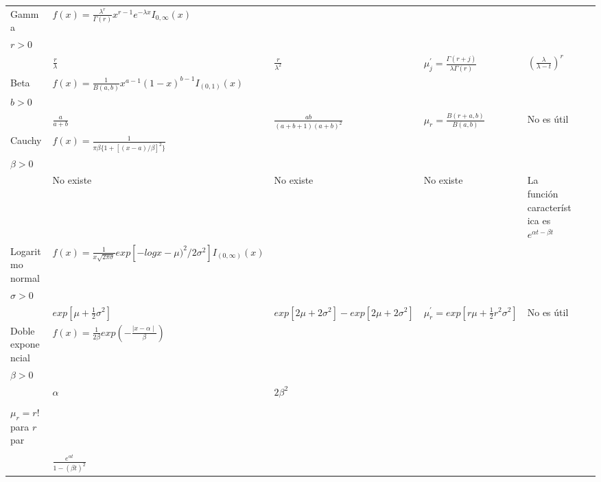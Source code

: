 \begin{table}[ht!]
\begin{tabular}{|p{1.5cm}|p{5.12cm}|p{2.13cm}|p{1.8cm}|p{2.13cm}|p{4cm}|p{2cm}|}
        Gamma &
        $f(x) = \frac{\lambda^r}{\Gamma(r)}x^{r-1}e^{-\lambda x}I_{0,\infty}(x)$ &
        \Longunderstack{
        $\lambda > 0$ \\ $r > 0$
        \\} &
        $\frac{r}{\lambda}$ &
        $\frac{r}{\lambda^2}$ &
        $\mu_j^{'} = \frac{\Gamma(r+j)}{\lambda\Gamma(r)}$ &
        $(\frac{\lambda}{\lambda - t})^r$
        \\ \hline
        
        Beta &
        $f(x)=\frac{1}{B(a,b)}x^{a-1}(1-x)^{b-1}I_{(0,1)}(x)$ &
        \Longunderstack{
        $a > 0$ \\ $b > 0$
        \\} &
        $\frac{a}{a+b}$ &
        $\frac{ab}{(a+b+1)(a+b)^2}$ &
        $\mu_r = \frac{B(r+a,b)}{B(a,b)}$ &
        No es útil
        \\ \hline
        
        Cauchy &
        $f(x) = \frac{1}{\pi \beta\{1+[(x-a)/\beta]^2\}}$  &
        \Longunderstack{
        $-\infty < \lambda < \infty $ \\ $\beta > 0$
        \\} &
        No existe &
        No existe &
        No existe &
        \footnotesize
        La función característica es $e^{\alpha t-\beta t}$
        \\ \hline
        
        Logaritmo normal &
        \footnotesize
        $f(x) = \frac{1}{x\sqrt{2\pi\sigma}}exp[-logx-\mu)^2/ 2\sigma^2]I_{(0,\infty)}(x)$ &
        \Longunderstack{
        $-\infty < \mu < \infty $ \\ $\sigma > 0$
        \\} &
        \small
        $exp[\mu + \frac{1}{2}\sigma^2]$ &
        \small
        $exp[2\mu+2\sigma^2]-exp[2\mu+2\sigma^2]$
        \normalsize &
        $\mu_r^{'} = exp[r\mu +\frac{1}{2}r^2\sigma^2]$ &
        No es útil
        \\ \hline
         
        Doble exponencial &
        $f(x) = \frac{1}{2\beta}exp(-\frac{\mid x-\alpha\mid }{\beta})$ &
         \Longunderstack{
        $-\infty < \alpha < \infty $ \\ $\beta > 0$
        \\} &
        $\alpha$ &
        $2\beta^2$ &
        \Longunderstack{
        $\mu_r = 0$, para $r$ impar \\ \\
        $\mu_r = r!$ para $r$ par \\ \\ } &
        $\frac{e^{\alpha t}}{1-(\beta t)^2}$
        \\ \hline
        

\end{tabular}
\end{table}
